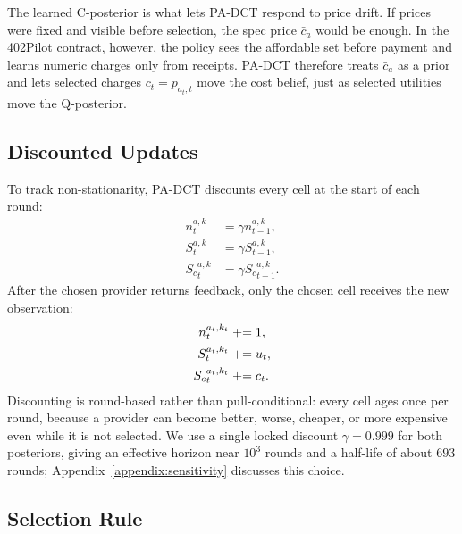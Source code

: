 The learned C-posterior is what lets PA-DCT respond to price drift. If prices were fixed and visible before selection, the spec price $\bar c_a$ would be enough. In the 402Pilot contract, however, the policy sees the affordable set before payment and learns numeric charges only from receipts. PA-DCT therefore treats $\bar c_a$ as a prior and lets selected charges $c_t=p_{a_t,t}$ move the cost belief, just as selected utilities move the Q-posterior.

\subsection{Discounted Updates}
\label{sec:method-discount}

To track non-stationarity, PA-DCT discounts every cell at the start of each round:
\begin{equation}
\begin{aligned}
n^{a,k}_t &= \gamma n^{a,k}_{t-1},\\
S^{a,k}_t &= \gamma S^{a,k}_{t-1},\\
{S_c}^{a,k}_t &= \gamma {S_c}^{a,k}_{t-1}.
\end{aligned}
\end{equation}
After the chosen provider returns feedback, only the chosen cell receives the new observation:
\begin{equation}
\begin{aligned}
n^{a_t,k_t}_t &\mathrel{+}= 1,\\
S^{a_t,k_t}_t &\mathrel{+}= u_t,\\
{S_c}^{a_t,k_t}_t &\mathrel{+}= c_t.
\end{aligned}
\end{equation}
Discounting is round-based rather than pull-conditional: every cell ages once per round, because a provider can become better, worse, cheaper, or more expensive even while it is not selected. We use a single locked discount $\gamma=0.999$ for both posteriors, giving an effective horizon near $10^3$ rounds and a half-life of about $693$ rounds; Appendix~\ref{appendix:sensitivity} discusses this choice.

\subsection{Selection Rule}
\label{sec:method-decision}

